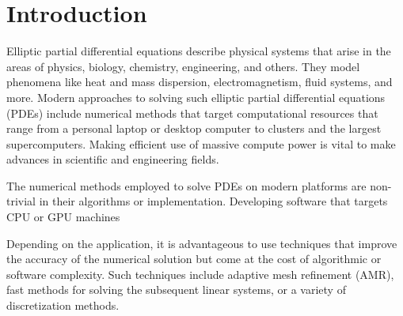 \section{Introduction}

Elliptic partial differential equations describe physical systems that arise in the areas of physics, biology, chemistry, engineering, and others. They model phenomena like heat and mass dispersion, electromagnetism, fluid systems, and more. Modern approaches to solving such elliptic partial differential equations (PDEs) include numerical methods that target computational resources that range from a personal laptop or desktop computer to clusters and the largest supercomputers. Making efficient use of massive compute power is vital to make advances in scientific and engineering fields.

The numerical methods employed to solve PDEs on modern platforms are non-trivial in their algorithms or implementation. Developing software that targets CPU or GPU machines 

Depending on the application, it is advantageous to use techniques that improve the accuracy of the numerical solution but come at the cost of algorithmic or software complexity. Such techniques include adaptive mesh refinement (AMR), fast methods for solving the subsequent linear systems, or a variety of discretization methods.



